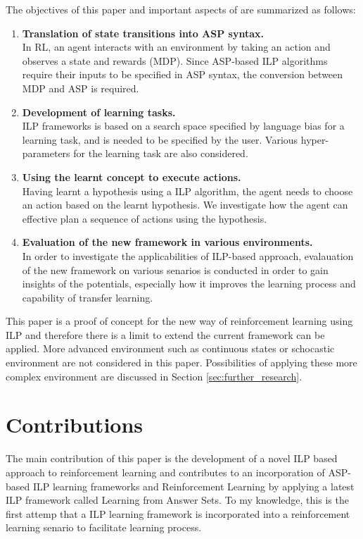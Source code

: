 The objectives of this paper and important aspects of are summarized as follows:

\newcommand\litem[1]{\item{\bfseries #1.\\}}
\begin{enumerate}
\litem{Translation of state transitions into ASP syntax} 
In RL, an agent interacts with an environment by taking an action and observes a state and rewards (MDP). 
Since ASP-based ILP algorithms require their inputs to be specified in ASP syntax, the conversion between MDP and ASP is required.
\litem{Development of learning tasks} ILP frameworks is based on a search space specified by language bias for a learning task, and is needed to be specified by the user. 
Various hyper-parameters for the learning task are also considered.
\litem{Using the learnt concept to execute actions} 
Having learnt a hypothesis using a ILP algorithm, the agent needs to choose an action based on the learnt hypothesis.
We investigate how the agent can effective plan a sequence of actions using the hypothesis.
\litem{Evaluation of the new framework in various environments}
In order to investigate the applicabilities of ILP-based approach, evalauation of the new framework on various senarios is conducted in order to gain
insights of the potentials, especially how it improves the learning process and capability of transfer learning.
\end{enumerate}

This paper is a proof of concept for the new way of reinforcement learning using ILP and therefore there is a limit to extend the current framework can be applied.
More advanced environment such as continuous states or schocastic environment are not considered in this paper. Possibilities of applying these more complex environment are discussed in Section \ref{sec:further_research}.

\section{Contributions}
\label{contributions}
The main contribution of this paper is the development of a novel ILP based approach to reinforcement learning and contributes to an incorporation of ASP-based ILP learning frameworks and Reinforcement Learning by applying a latest ILP framework called Learning from Answer Sets. 
To my knowledge, this is the first attemp that a ILP learning framework is incorporated into a reinforcement learning senario to facilitate learning process.

